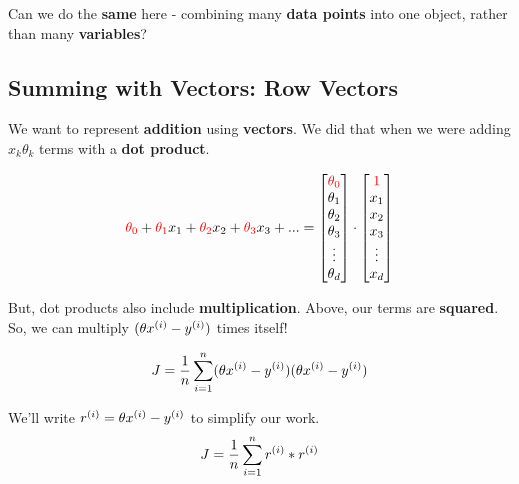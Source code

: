         Can we do the \textbf{same} here - combining many \textbf{data points} into one object, rather than many \textbf{variables}?
    
    \subsection{Summing with Vectors: Row Vectors}
        
        We want to represent \textbf{addition} using \textbf{vectors}. We did that when we were adding $x_k\theta_k$ terms with a \textbf{dot product}.
        
        \begin{equation}
            \textcolor{red}{\theta_0} + \textcolor{red}{\theta_1}x_1 + \textcolor{red}{\theta_2}x_2 + \textcolor{red}{\theta_3}x_3 + ...
            =
            \begin{bmatrix}
              \textcolor{red}{\theta_0} \\ \theta_1 \\ \theta_2 \\ \theta_3 \\ \vdots \\ \theta_d
            \end{bmatrix}
            \cdot
            \begin{bmatrix}
              \textcolor{red}{1} \\ x_1 \\ x_2 \\ x_3 \\ \vdots \\ x_d
            \end{bmatrix}
        \end{equation}
        
        But, dot products also include \textbf{multiplication}. Above, our terms are \textbf{squared}. So, we can multiply $(\theta x^{(i)} - y^{(i)} )$ times itself!
        
        \begin{equation}
            J = 
            \frac{1}{n}  \sum_{i=1}^n 
            (\theta x^{(i)}  - y^{(i)} ) (\theta x^{(i)}  - y^{(i)} )  
        \end{equation}
        
        We'll write $r^{(i)} = \theta x^{(i)}  - y^{(i)}$ to simplify our work. 
        \begin{equation}
            J = \frac{1}{n}  \sum_{i=1}^n
            r^{(i)}*r^{(i)}
        \end{equation}
        
